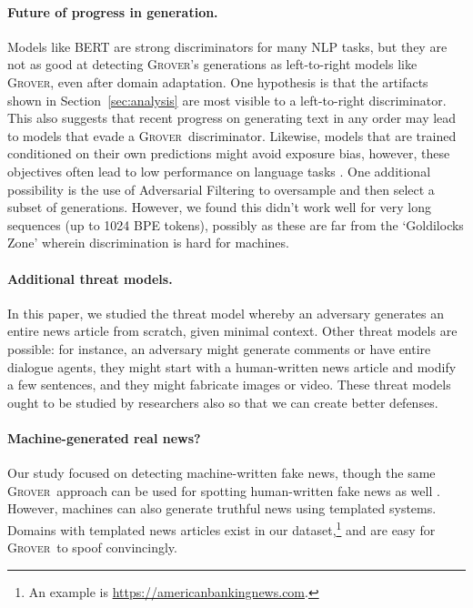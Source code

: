 \documentclass{article}
\newcommand{\modelname}{{\textsc{Grover}}}
\newcommand{\modelnamefordisc}{{\textsc{Grover}}}
\begin{document}
\paragraph{Future of progress in generation.} 
Models like BERT are strong discriminators for many NLP tasks, but they are not as good at detecting \modelname's generations as left-to-right models like \modelname, even after domain adaptation. One hypothesis is that the artifacts shown in Section~\ref{sec:analysis} are most visible to a left-to-right discriminator. This also suggests that recent progress on generating text in any order \citep{gu2019insertion, stern2019insertion, ghazvininejad2019constant} may lead to models that evade a \modelnamefordisc~discriminator. Likewise, models that are trained conditioned on their own predictions might avoid exposure bias, however, these objectives often lead to low performance on language tasks \citep{caccia2018language}. One additional possibility is the use of Adversarial Filtering \citep{zellers2018swagaf, zellers2018hellaswag} to oversample and then select a subset of generations. However, we found this didn't work well for very long sequences (up to 1024 BPE tokens), possibly as these are far from the `Goldilocks Zone' wherein discrimination is hard for machines.

\paragraph{Additional threat models.} In this paper, we studied the threat model whereby an adversary generates an entire news article from scratch, given minimal context. Other threat models are possible: for instance, an adversary might generate comments or have entire dialogue agents, they might start with a human-written news article and modify a few sentences, and they might fabricate images or video. These threat models ought to be studied by researchers also so that we can create better defenses. 

\paragraph{Machine-generated real news?} Our study focused on detecting machine-written fake news, though the same \modelname~approach can be used for spotting human-written fake news as well \citep{zellers2019blogpost}. However, machines can also generate truthful news using templated systems. Domains with templated news articles exist in our dataset,\footnote{An example is \url{https://americanbankingnews.com}.} and are easy for \modelname~to spoof convincingly. 
\end{document}
